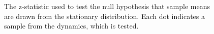 \begin{figure}[hp]
	\centering
        \caption{The z-statistic used to test the null hypothesis that sample means are drawn from the stationary distribution. Each dot indicates a sample from the dynamics, which is tested.}    
    \label{fig:zscore}
\end{figure}


